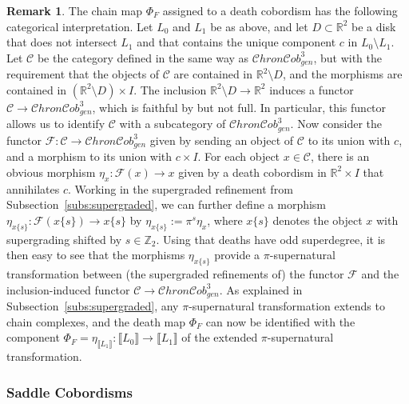 \documentclass[12pt]{amsart}
\theoremstyle{definition}
\newtheorem{remark}{Remark}
\theoremstyle{plain}
\newcommand{\cobIIIgen}{\mathcal{C}hron\mathcal{C}ob^3_{gen}}
\begin{document}
\begin{remark}\label{rem:deathpisupernatural} The chain map $\Phi_F$ assigned to a death cobordism has the following
categorical interpretation. Let $L_0$ and $L_1$ be as above, and let $D\subset\mathbb{R}^2$ be
a disk that does not intersect $L_1$ and that contains the unique component $c$ in $L_0\setminus L_1$.
Let $\mathcal{C}$ be the category defined in the same way as $\cobIIIgen$,
but with the requirement that
the objects of $\mathcal{C}$ are contained in $\mathbb{R}^2\setminus D$, and the morphisms
are contained in $(\mathbb{R}^2\setminus D)\times I$. The inclusion $\mathbb{R}^2\setminus D\rightarrow\mathbb{R}^2$
induces a functor $\mathcal{C}\rightarrow\cobIIIgen$, which is faithful by \cite[Cor.~88]{NW2024} but not full. 
In particular, this functor allows us to identify $\mathcal{C}$ with a subcategory of $\cobIIIgen$.
Now consider the functor $\mathcal{F}\colon\mathcal{C}\rightarrow\cobIIIgen$ given by sending an object of $\mathcal{C}$ to its union with $c$, and a morphism
to its union with $c\times I$. For each object $x\in\mathcal{C}$, there is an obvious
morphism $\eta_x\colon\mathcal{F}(x)\rightarrow x$ given by a death cobordism in $\mathbb{R}^2\times I$
that annihilates $c$. Working in the supergraded refinement from Subsection~\ref{subs:supergraded},
we can further define a morphism
$\eta_{x\{s\}}\colon \mathcal{F}(x\{s\})\rightarrow x\{s\}$ by $\eta_{x\{s\}}:=\pi^s\eta_x$,
where $x\{s\}$ denotes the object $x$ with supergrading shifted by $s\in\mathbb{Z}_2$.
Using that deaths have odd superdegree, it is then easy to see
that the morphisms $\eta_{x\{s\}}$ provide a $\pi$-supernatural transformation
between  (the supergraded refinements of) the
functor $\mathcal{F}$ and the inclusion-induced functor $\mathcal{C}\rightarrow\cobIIIgen$.
As explained in Subsection~\ref{subs:supergraded}, any $\pi$-supernatural transformation
extends to chain complexes, and the death map $\Phi_F$ can now be identified with
the component
$\Phi_F=\eta_{\llbracket L_1\rrbracket}\colon\llbracket L_0\rrbracket\rightarrow\llbracket L_1\rrbracket$
of the extended $\pi$-supernatural transformation.
\end{remark}


\subsubsection{Saddle Cobordisms}
\end{document}
